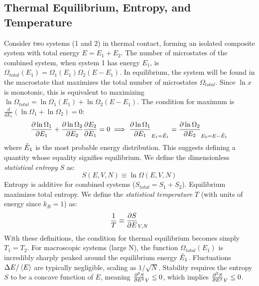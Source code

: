 \documentclass[10pt, letterpaper]{article}
\newcommand{\avg}[1]{\expval{#1}} %
\begin{document}
\subsection{Thermal Equilibrium, Entropy, and Temperature}
Consider two systems (1 and 2) in thermal contact, forming an isolated composite system with total energy $E = E_1 + E_2$. The number of microstates of the combined system, when system 1 has energy $E_1$, is $\Omega_{total}(E_1) = \Omega_1(E_1) \Omega_2(E - E_1)$.
In equilibrium, the system will be found in the macrostate that maximizes the total number of microstates $\Omega_{total}$. Since $\ln x$ is monotonic, this is equivalent to maximizing $\ln \Omega_{total} = \ln \Omega_1(E_1) + \ln \Omega_2(E - E_1)$.
The condition for maximum is $\frac{d}{dE_1} (\ln \Omega_1 + \ln \Omega_2) = 0$:
\begin{equation*}
    \pdv{\ln \Omega_1}{E_1} + \pdv{\ln \Omega_2}{E_2} \pdv{E_2}{E_1} = 0 \implies \pdv{\ln \Omega_1}{E_1}_{E_1=\Tilde{E}_1} = \pdv{\ln \Omega_2}{E_2}_{E_2=E-\Tilde{E}_1}
\end{equation*}
where $\Tilde{E}_1$ is the most probable energy distribution. This suggests defining a quantity whose equality signifies equilibrium.
We define the dimensionless \textit{statistical entropy} $S$ as:
\begin{equation}
    S(E, V, N) \equiv \ln \Omega(E, V, N)
\end{equation}
Entropy is additive for combined systems ($S_{total} = S_1 + S_2$). Equilibrium maximizes total entropy.
We define the \textit{statistical temperature} $T$ (with units of energy since $k_B=1$) as:
\begin{equation}
    \frac{1}{T} \equiv \pdv{S}{E}_{V, N}
\end{equation}
With these definitions, the condition for thermal equilibrium becomes simply $T_1 = T_2$.
For macroscopic systems (large N), the function $\Omega_{total}(E_1)$ is incredibly sharply peaked around the equilibrium energy $\Tilde{E}_1$. Fluctuations $\Delta E / \avg{E}$ are typically negligible, scaling as $1/\sqrt{N}$. Stability requires the entropy $S$ to be a concave function of $E$, meaning $\pdv[2]{S}{E}_{V} \leq 0$, which implies $\pdv{^2 S}{E^2}_{V} \leq 0$.
\end{document}
